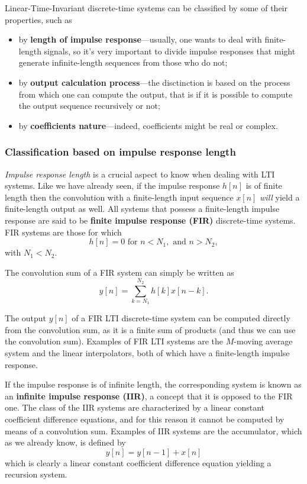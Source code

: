 \documentclass[\documentfontsize, twocolumn]{\classname}
\begin{document}
Linear-Time-Invariant discrete-time systems can be classified by some of their properties, such as
\begin{itemize}
    \item by \textbf{length of impulse response}---usually, one wants to deal with finite-length signals, so it's very important to divide impulse responses that might generate infinite-length sequences from those who do not;
    \item by \textbf{output calculation process}---the disctinction is based on the process from which one can compute the output, that is if it is possible to compute the output sequence recursively or not;
    \item by \textbf{coefficients nature}---indeed, coefficients might be real or complex.
\end{itemize}

\subsubsection{Classification based on impulse response length}
\emph{Impulse response length} is a crucial aspect to know when dealing with LTI systems. Like we have already seen, if the impulse response $h[n]$ is of finite length then the convolution with a finite-length input sequence $x[n]$ \emph{will} yield a finite-length output as well. All systems that possess a finite-length impulse response are said to be \textbf{finite impulse response (FIR)} discrete-time systems. FIR systems are those for which
\begin{equation}\label{eqn:finiteImpulseResponse}
    h[n] = 0 \mbox{ for } n < N_1, \mbox{ and } n > N_2,
\end{equation}
with $N_1 < N_2$.

The convolution sum of a FIR system can simply be written as
\begin{equation}\label{eqn:finiteImpulseResponseEquation}
    y[n]=\sum_{k=N_1}^{N_2} h[k]x[n-k].
\end{equation}

The output $y[n]$ of a FIR LTI discrete-time system can be computed directly from the convolution sum, as it is a finite sum of products (and thus we can use the convolution sum). Examples of FIR LTI systems are the $M$-moving average system and the linear interpolators, both of which have a finite-length impulse response.

If the impulse response is of infinite length, the corresponding system is known as an \textbf{infinite impulse response (IIR)}, a concept that it is opposed to the FIR one. The class of the IIR systems are characterized by a linear constant coefficient difference equations, and for this reason it cannot be computed by means of a convolution sum. Examples of IIR systems are the accumulator, which as we already know, is defined by
\[
    y[n] = y[n-1] + x[n]
\]
which is clearly a linear constant coefficient difference equation yielding a recursion system.
\end{document}
